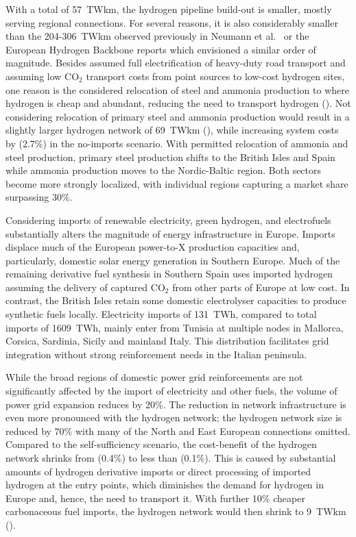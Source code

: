 
With a total of 57~TWkm, the hydrogen pipeline build-out is smaller, mostly
serving regional connections. For several reasons, it is also considerably
smaller than the 204-306~TWkm observed previously in Neumann et
al.~\cite{neumannPotentialRoleHydrogen2023} or the European Hydrogen Backbone
reports\cite{gasforclimateEuropeanHydrogen2022} which envisioned a similar order
of magnitude. Besides assumed full electrification of heavy-duty road
transport\cite{} and assuming low CO$_2$ transport costs from point sources to
low-cost hydrogen sites,\cite{hofmannH2CO2Network2024} one reason is the
considered relocation of steel and ammonia production to where hydrogen is cheap
and abundant, reducing the need to transport hydrogen
(). Not considering relocation of primary steel and
ammonia production would result in a slightly larger hydrogen network of 69~TWkm
(), while increasing system costs by  (2.7\%)
in the no-imports scenario. With permitted relocation of ammonia and steel
production, primary steel production shifts to the British Isles and Spain while
ammonia production moves to the Nordic-Baltic region. Both sectors become more
strongly localized, with individual regions capturing a market share surpassing
30\%.


Considering imports of renewable electricity, green hydrogen, and electrofuels
substantially alters the magnitude of energy infrastructure in Europe. Imports
displace much of the European power-to-X production capacities and,
particularly, domestic solar energy generation in Southern Europe. Much of the
remaining derivative fuel synthesis in Southern Spain uses imported hydrogen
assuming the delivery of captured CO$_2$ from other parts of Europe at low
cost.\cite{hofmannH2CO2Network2024} In contrast, the British Isles retain some
domestic electrolyser capacities to produce synthetic fuels locally. Electricity
imports of 131~TWh, compared to total imports of 1609~TWh, mainly enter from
Tunisia at multiple nodes in Mallorca, Corsica, Sardinia, Sicily and mainland
Italy. This distribution facilitates grid integration without strong
reinforcement needs in the Italian peninsula.

While the broad regions of domestic power grid reinforcements are not
significantly affected by the import of electricity and other fuels, the volume
of power grid expansion reduces by 20\%. The reduction in network infrastructure
is even more pronounced with the hydrogen network; the hydrogen network size is
reduced by 70\% with many of the North and East European connections omitted. 
Compared to the self-sufficiency scenario, the cost-benefit of the hydrogen
network shrinks from  (0.4\%) to less than  (0.1\%). This is
caused by substantial amounts of hydrogen derivative imports or direct
processing of imported hydrogen at the entry points, which diminishes the demand
for hydrogen in Europe and, hence, the need to transport it. With further 10\%
cheaper carbonaceous fuel imports, the hydrogen network would then shrink to
9~TWkm ().

